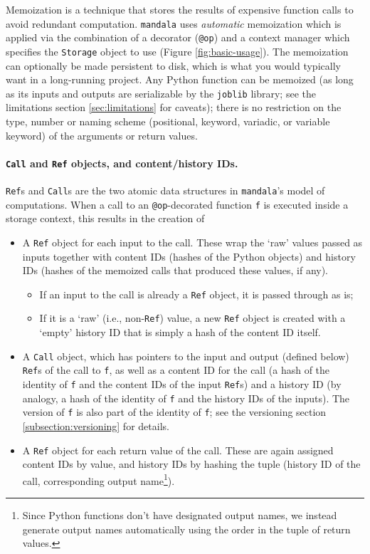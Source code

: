 Memoization is a technique that stores the results of expensive function calls
to avoid redundant computation. \texttt{mandala} uses \emph{automatic}
memoization \citep{norvig1991techniques} which is applied via the combination of
a decorator (\texttt{@op}) and a context manager which specifies the
\texttt{Storage} object to use (Figure \ref{fig:basic-usage}). The memoization
can optionally be made persistent to disk, which is what you would typically
want in a long-running project. Any Python function can be memoized (as long as
its inputs and outputs are serializable by the \texttt{joblib} library; see the
limitations section \ref{sec:limitations} for caveats); there is no restriction
on the type, number or naming scheme (positional, keyword, variadic, or variable
keyword) of the arguments or return values.

\paragraph{\texttt{Call} and \texttt{Ref} objects, and content/history IDs.}
\texttt{Ref}s and \texttt{Call}s are the two atomic data structures in
\texttt{mandala}'s model of computations. When a call to an
\texttt{@op}-decorated function \texttt{f} is executed inside a storage context,
this results in the creation of
\begin{itemize}
\item A \texttt{Ref} object for each input to the call. These wrap the `raw'
values passed as inputs together with content IDs (hashes of the Python objects)
and history IDs (hashes of the memoized calls that produced these values, if
any).
\begin{itemize}
\item If an input to the call is already a \texttt{Ref} object, it is passed
through as is;
\item If it is a `raw' (i.e., non-\texttt{Ref}) value, a new \texttt{Ref} object
is created with a `empty' history ID that is simply a hash of the content ID
itself.
\end{itemize}
\item A \texttt{Call} object, which has pointers to the input and output
(defined below) \texttt{Ref}s of the call to \texttt{f}, as well as a content ID
for the call (a hash of the identity of \texttt{f} and the content IDs of the
input \texttt{Ref}s) and a history ID (by analogy, a hash of the identity of
\texttt{f} and the history IDs of the inputs). The version of \texttt{f} is also part of the identity of \texttt{f}; see the versioning section \ref{subsection:versioning} for details.
\item A \texttt{Ref} object for each return value of the call. These are again
assigned content IDs by value, and history IDs by hashing the tuple (history ID
of the call, corresponding output name\footnote{Since Python functions don't
have designated output names, we instead generate output names automatically using the order in the tuple of return values.}).
\end{itemize}

